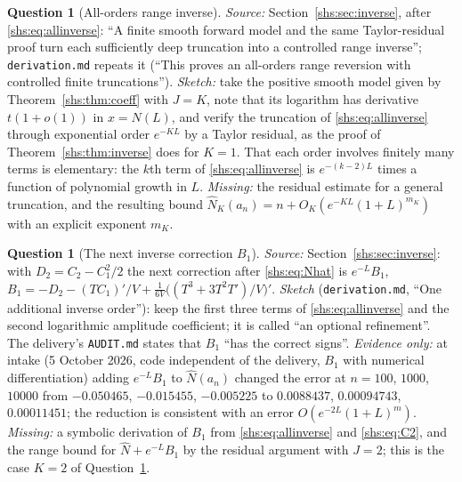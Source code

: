 \documentclass[11pt]{article}
\theoremstyle{definition}
\newtheorem{question}[theorem]{Question}
\theoremstyle{plain}
\begin{document}
\begin{question}[All-orders range inverse]\label{shs:q:allorders}
\emph{Source:} Section~\ref{shs:sec:inverse}, after
\eqref{shs:eq:allinverse}: ``A finite smooth forward model and the same
Taylor-residual proof turn each sufficiently deep truncation into a
controlled range inverse''; \nolinkurl{derivation.md} repeats it (``This
proves an all-orders range reversion with controlled finite
truncations''). \emph{Sketch:} take the positive smooth model given by
Theorem~\ref{shs:thm:coeff} with $J=K$, note that its logarithm has
derivative $t(1+o(1))$ in $x=N(L)$, and verify the truncation of
\eqref{shs:eq:allinverse} through exponential order $e^{-KL}$ by a Taylor
residual, as the proof of Theorem~\ref{shs:thm:inverse} does for $K=1$.
That each order involves finitely many terms is elementary: the $k$th
term of \eqref{shs:eq:allinverse} is $e^{-(k-2)L}$ times a function of
polynomial growth in $L$. \emph{Missing:} the residual estimate for a
general truncation, and the resulting bound
$\widehat N_K(a_n)=n+O_K(e^{-KL}(1+L)^{m_K})$ with an explicit exponent
$m_K$.
\end{question}

\begin{question}[The next inverse correction $B_1$]\label{shs:q:B1}
\emph{Source:} Section~\ref{shs:sec:inverse}: with $D_2=C_2-C_1^2/2$ the
next correction after \eqref{shs:eq:Nhat} is $e^{-L}B_1$,
$B_1=-D_2-(TC_1)'/V+\frac1{6V}\bigl((T^3+3T^2T')/V\bigr)'$.
\emph{Sketch} (\nolinkurl{derivation.md}, ``One additional inverse
order''): keep the first three terms of \eqref{shs:eq:allinverse} and the
second logarithmic amplitude coefficient; it is called ``an optional
refinement''. The delivery's \nolinkurl{AUDIT.md} states that $B_1$ ``has
the correct signs''. \emph{Evidence only:} at intake (5 October 2026,
code independent of the delivery, $B_1$ with numerical differentiation)
adding $e^{-L}B_1$ to $\widehat N(a_n)$ changed the error at $n=100$,
$1000$, $10000$ from $-0.050465$, $-0.015455$, $-0.005225$ to
$0.0088437$, $0.00094743$, $0.00011451$; the reduction is consistent
with an error $O(e^{-2L}(1+L)^m)$. \emph{Missing:} a symbolic derivation
of $B_1$ from \eqref{shs:eq:allinverse} and \eqref{shs:eq:C2}, and the
range bound for $\widehat N+e^{-L}B_1$ by the residual argument with
$J=2$; this is the case $K=2$ of Question~\ref{shs:q:allorders}.
\end{question}
\end{document}
